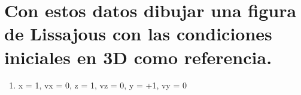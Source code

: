\documentclass[11pt]{article}
\providecommand{\tightlist}{%
      \setlength{\itemsep}{0pt}\setlength{\parskip}{0pt}}
\begin{document}
    \begin{center}
    \end{center}
    { \hspace*{\fill} \\}
    
    \begin{center}
    \end{center}
    { \hspace*{\fill} \\}
    
    \begin{center}
    \end{center}
    { \hspace*{\fill} \\}
    
    \begin{center}
    \end{center}
    { \hspace*{\fill} \\}
    
    \begin{center}
    \end{center}
    { \hspace*{\fill} \\}
    
    \hypertarget{con-estos-datos-dibujar-una-figura-de-lissajous-con-las-condiciones-iniciales-en-3d-como-referencia.}{%
\section{Con estos datos dibujar una figura de Lissajous con las
condiciones iniciales en 3D como
referencia.}\label{con-estos-datos-dibujar-una-figura-de-lissajous-con-las-condiciones-iniciales-en-3d-como-referencia.}}

    \begin{enumerate}
\def\labelenumi{(\alph{enumi})}
\tightlist
\item
  x = 1, vx = 0, z = 1, vz = 0, y = +1, vy = 0
\end{enumerate}
\end{document}
